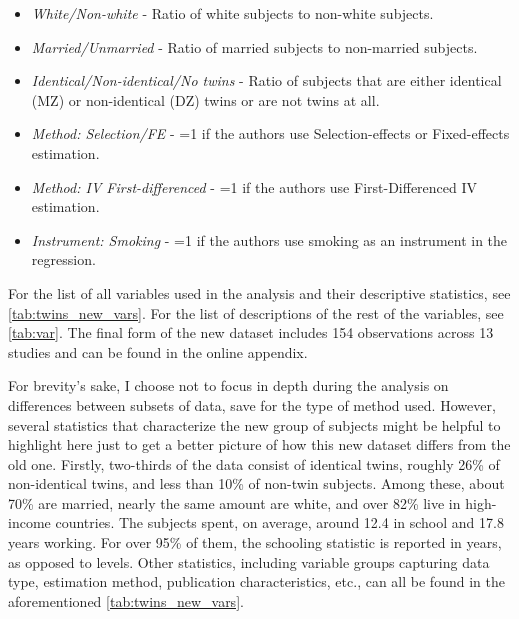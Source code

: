 \begin{itemize}
  \item \textit{White/Non-white} - Ratio of white subjects to non-white subjects.
  \item \textit{Married/Unmarried} - Ratio of married subjects to non-married subjects.
  \item \textit{Identical/Non-identical/No twins} - Ratio of subjects that are either identical (MZ) or non-identical (DZ) twins or are not twins at all.
  \item \textit{Method: Selection/FE} - =1 if the authors use  Selection-effects or Fixed-effects estimation.
  \item \textit{Method: IV First-differenced} - =1 if the authors use First-Differenced IV estimation.
  \item \textit{Instrument: Smoking} - =1 if the authors use smoking as an instrument in the regression.
\end{itemize}



For the list of all variables used in the analysis and their descriptive statistics, see \autoref{tab:twins_new_vars}. For the list of descriptions of the rest of the variables, see \autoref{tab:var}. The final form of the new dataset includes 154 observations across 13 studies and can be found in the online appendix.





For brevity's sake, I choose not to focus in depth during the analysis on differences between subsets of data, save for the type of method used. However, several statistics that characterize the new group of subjects might be helpful to highlight here just to get a better picture of how this new dataset differs from the old one. Firstly, two-thirds of the data consist of identical twins, roughly 26\% of non-identical twins, and less than 10\% of non-twin subjects. Among these, about 70\% are married, nearly the same amount are white, and over 82\% live in high-income countries. The subjects spent, on average, around 12.4 in school and 17.8 years working. For over 95\% of them, the schooling statistic is reported in years, as opposed to levels. Other statistics, including variable groups capturing data type, estimation method, publication characteristics, etc., can all be found in the aforementioned \autoref{tab:twins_new_vars}.

